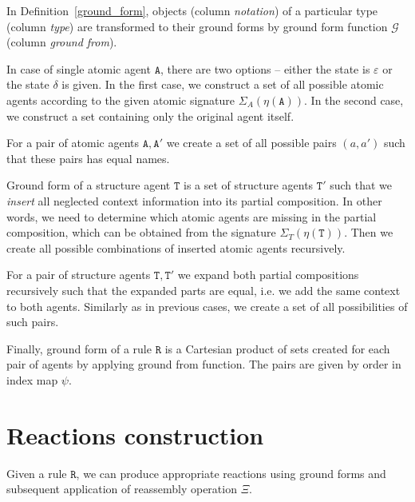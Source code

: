 \documentclass[12pt, twoside]{fithesis2} %
\begin{document}
In Definition~\ref{ground_form}, objects (column \emph{notation}) of a particular type (column \emph{type}) are transformed to their ground forms by ground form function $\mathcal{G}$ (column \emph{ground from}).

In case of single atomic agent $\mathtt{A}$, there are two options -- either the state is $\varepsilon$ or the state $\delta$ is given. In the first case, we construct a set of all possible atomic agents according to the given atomic signature $\Sigma_A(\eta(\mathtt{A}))$. In the second case, we construct a set containing only the original agent itself.

For a pair of atomic agents $\mathtt{A}, \mathtt{A}'$ we create a set of all possible pairs $(a, a')$ such that these pairs has equal names.

Ground form of a structure agent $\mathtt{T}$ is a set of structure agents $\mathtt{T}'$ such that we \emph{insert} all neglected context information into its partial composition. In other words, we need to determine which atomic agents are missing in the partial composition, which can be obtained from the signature $\Sigma_T(\eta(\mathtt{T}))$. Then we create all possible combinations of inserted atomic agents recursively.

For a pair of structure agents $\mathtt{T}, \mathtt{T}'$ we expand both partial compositions recursively such that the expanded parts are equal, i.e. we add the same context to both agents. Similarly as in previous cases, we create a set of all possibilities of such pairs.

Finally, ground form of a rule $\mathtt{R}$ is a Cartesian product of sets created for each pair of agents by applying ground from function. The pairs are given by order in index map $\psi$.

\section{Reactions construction}
\label{Generating reactions}

Given a rule $\mathtt{R}$, we can produce appropriate reactions using ground forms and subsequent application of reassembly operation $\Xi$.
\end{document}
